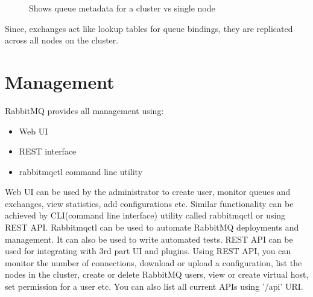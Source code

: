 \documentclass[9pt,twocolumn,twoside]{styles/osajnl}
\begin{document}
\begin{figure}[htbp]
\centering
{}
\caption{Shows queue metadata for a cluster vs single node \cite{videla2012rabbitmq}}
\label{fig:false-color}
\end{figure}

Since, exchanges act like lookup tables for queue bindings, they are replicated
across all nodes on the cluster. 

\section{Management}
RabbitMQ provides all management using:
\begin{itemize}
	\item Web UI 
	\item REST interface
	\item rabbitmqctl command line utility
\end{itemize}

Web UI can be used by the administrator to create user, monitor queues and
exchanges, view statistics, add configurations etc. Similar functionality can be
achieved by CLI(command line interface) utility called rabbitmqctl or using REST
API. Rabbitmqctl can be used to automate RabbitMQ deployments and management. It
can also be used to write automated tests. REST API can be used for integrating
with 3rd part UI and plugins.  Using REST API, you can monitor the number of
connections, download or upload a configuration, list the nodes in the cluster,
create or delete RabbitMQ users, view or create virtual host, set permission for
a user etc. You can also list all current APIs using '/api' URI.
\end{document}

